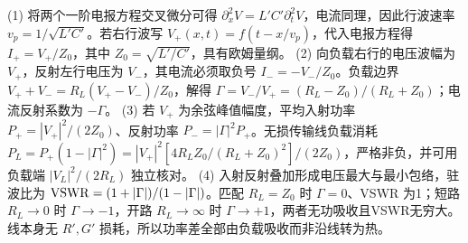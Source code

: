 (1) 将两个一阶电报方程交叉微分可得 \(\partial_x^2V=L'C'\partial_t^2V\)，电流同理，因此行波速率 \(v_p=1/\sqrt{L'C'}\)。若右行波写 \(V_+(x,t)=f(t-x/v_p)\)，代入电报方程得 \(I_+=V_+/Z_0\)，其中 \(Z_0=\sqrt{L'/C'}\)，具有欧姆量纲。
(2) 向负载右行的电压波幅为 \(V_+\)，反射左行电压为 \(V_-\)，其电流必须取负号 \(I_-=-V_-/Z_0\)。负载边界 \(V_++V_-=R_L(V_+-V_-)/Z_0\)，解得 \(\Gamma=V_-/V_+=(R_L-Z_0)/(R_L+Z_0)\)；电流反射系数为 \(-\Gamma\)。
(3) 若 \(V_+\) 为余弦峰值幅度，平均入射功率 \(P_+=|V_+|^2/(2Z_0)\)、反射功率 \(P_-=|\Gamma|^2P_+\)。无损传输线负载消耗 \(P_L=P_+(1-|\Gamma|^2)=|V_+|^2[4R_LZ_0/(R_L+Z_0)^2]/(2Z_0)\)，严格非负，并可用负载端 \(|V_L|^2/(2R_L)\) 独立核对。
(4) 入射反射叠加形成电压最大与最小包络，驻波比为 \({\rm VSWR}=(1+|\Gamma|)/(1-|\Gamma|)\)。匹配 \(R_L=Z_0\) 时 \(\Gamma=0\)、VSWR 为1；短路 \(R_L\to0\) 时 \(\Gamma\to-1\)，开路 \(R_L\to\infty\) 时 \(\Gamma\to+1\)，两者无功吸收且VSWR无穷大。线本身无 \(R',G'\) 损耗，所以功率差全部由负载吸收而非沿线转为热。
